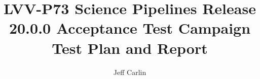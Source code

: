 \documentclass[DM,lsstdraft,toc]{lsstdoc}
\begin{document}
\def\milestoneName{Science Pipelines Release 20.0.0 Acceptance Test Campaign}
\def\milestoneId{LVV-P73}
\def\product{Data Management}


\title{LVV-P73 Science Pipelines Release 20.0.0 Acceptance Test Campaign Test Plan and Report}
\setDocRef{\lsstDocType-\lsstDocNum}
\date{\vcsdate}
\author{Jeff Carlin}



\end{document}
